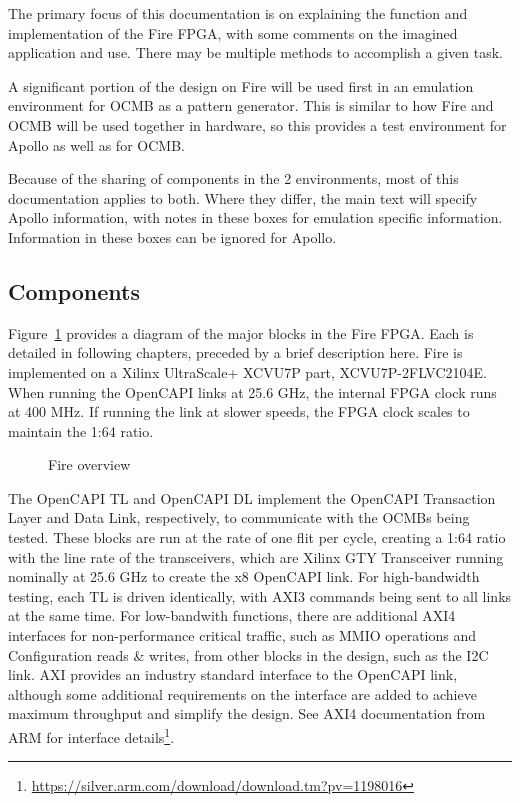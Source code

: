 The primary focus of this documentation is on explaining the function
and implementation of the Fire FPGA, with some comments on the
imagined application and use. There may be multiple methods to
accomplish a given task.

\begin{emulation}
A significant portion of the design on Fire will be used first in an
emulation environment for OCMB as a pattern generator. This is similar
to how Fire and OCMB will be used together in hardware, so this
provides a test environment for Apollo as well as for OCMB.

Because of the sharing of components in the 2 environments, most of
this documentation applies to both. Where they differ, the main text
will specify Apollo information, with notes in these boxes for
emulation specific information. Information in these boxes can be
ignored for Apollo.
\end{emulation}

\subsection{Components}
Figure~\ref{fig:fire} provides a diagram of the major blocks in the
Fire FPGA. Each is detailed in following chapters, preceded by a brief
description here. Fire is implemented on a Xilinx UltraScale+ XCVU7P
part, XCVU7P-2FLVC2104E. When running the OpenCAPI links at 25.6 GHz,
the internal FPGA clock runs at 400 MHz. If running the link at slower
speeds, the FPGA clock scales to maintain the 1:64 ratio.

\begin{figure}[h]
  \begin{center}
    \scalebox{.7}{}
  \end{center}
  \caption[Fire overview]{\label{fig:fire}Fire overview
  }
\end{figure}

The OpenCAPI TL and OpenCAPI DL implement the OpenCAPI Transaction
Layer and Data Link, respectively, to communicate with the OCMBs being
tested. These blocks are run at the rate of one flit per cycle,
creating a 1:64 ratio with the line rate of the transceivers, which
are Xilinx GTY Transceiver running nominally at 25.6 GHz to create the
x8 OpenCAPI link. For high-bandwidth testing, each TL is driven
identically, with AXI3 commands being sent to all links at the same
time. For low-bandwith functions, there are additional AXI4 interfaces
for non-performance critical traffic, such as MMIO operations and
Configuration reads \& writes, from other blocks in the design, such
as the I2C link. AXI provides an industry standard interface to the
OpenCAPI link, although some additional requirements on the interface
are added to achieve maximum throughput and simplify the design. See
AXI4 documentation from ARM for interface
details\footnote{\url{https://silver.arm.com/download/download.tm?pv=1198016}}.

